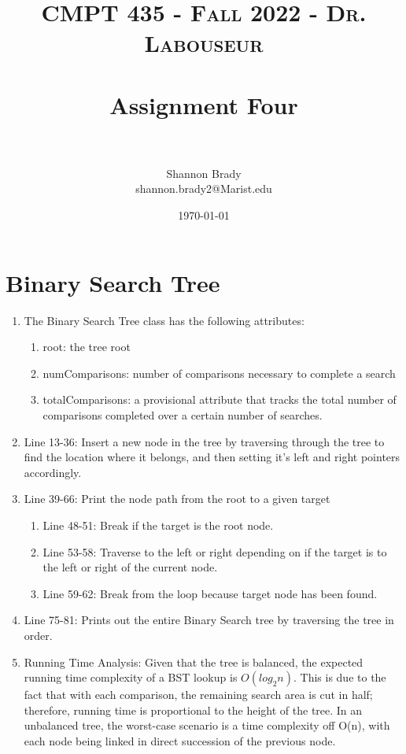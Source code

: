 \documentclass[letterpaper, 10pt,DIV=13]{scrartcl}
\title{	
   \normalfont \normalsize 
   \textsc{CMPT 435 - Fall 2022 - Dr. Labouseur} \\[10pt] %
   \horrule{0.5pt} \\[0.25cm] 	     %
   \huge Assignment Four  \\     	 %
   \horrule{0.5pt} \\[0.25cm] 	     %
}
\author{Shannon Brady \\ \normalsize shannon.brady2@Marist.edu}
\date{\normalsize\today} 	%
\numberwithin{equation}{section} %
\numberwithin{figure}{section} %
\numberwithin{table}{section} %
\begin{document}
\maketitle %

\section{Binary Search Tree}
\begin{enumerate}
    \item The Binary Search Tree class has the following attributes: 
    \begin{enumerate}
        \item root: the tree root
        \item numComparisons: number of comparisons necessary to complete a search
        \item totalComparisons: a provisional attribute that tracks the total number of comparisons completed over a certain number of searches.
    \end{enumerate}
    \item Line 13-36: Insert a new node in the tree by traversing through the tree to find the location where it belongs, and then setting it's left and right pointers accordingly.
    \item Line 39-66: Print the node path from the root to a given target
    \begin{enumerate}
        \item Line 48-51: Break if the target is the root node.
        \item Line 53-58: Traverse to the left or right depending on if the target is to the left or right of the current node.
        \item Line 59-62: Break from the loop because target node has been found.
    \end{enumerate}
    \item Line 75-81: Prints out the entire Binary Search tree by traversing the tree in order.
    \item Running Time Analysis: Given that the tree is balanced, the expected running time complexity of a BST lookup is $O(log_2n)$. This is due to the fact that with each comparison, the remaining search area is cut in half; therefore, running time is proportional to the height of the tree. In an unbalanced tree, the worst-case scenario is a time complexity off O(n), with each node being linked in direct succession of the previous node.
\end{enumerate}
\end{document}
